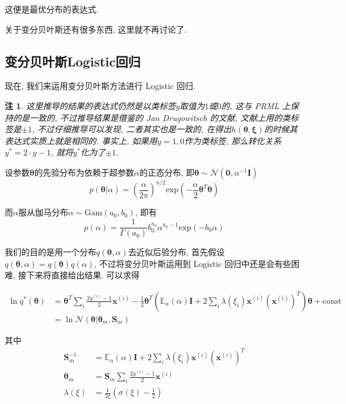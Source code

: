 \documentclass[a4paper,UTF8]{ctexart}
\theoremstyle{plain} \newtheorem{theorem}{定理}[section]
\theoremstyle{plain} \newtheorem{definition}{定义}[section]
\theoremstyle{plain} \newtheorem{lemma}{引理}[section]
\theoremstyle{plain} \newtheorem{proposition}{命题}[section]
\theoremstyle{plain} \newtheorem{example}{例}[section]
\theoremstyle{plain} \newtheorem{remark}{注}[section]
\theoremstyle{plain} \newtheorem{corollary}{推论}[section]
\begin{document}
这便是最优分布的表达式.

关于变分贝叶斯还有很多东西, 这里就不再讨论了.


\subsection{变分贝叶斯Logistic回归}
现在, 我们来运用变分贝叶斯方法进行 Logistic 回归.

\begin{remark}
这里推导的结果的表达式仍然是以类标签$y$取值为$1$或$0$的, 这与 PRML 上保持的是一致的, 不过推导结果是借鉴的 Jan Drugowitsch 的文献, 文献上用的类标签是$\pm 1$, 不过仔细推导可以发现, 二者其实也是一致的, 在得出$h(\bm{\theta}, \bm{\xi})$的时候其表达式实质上就是相同的. 事实上, 如果用$y = 1, 0$作为类标签, 那么转化关系$y^{*} = 2 \cdot y - 1$, 就将$y^{*}$化为了$\pm 1$.

\end{remark}

设参数$\bm{\theta}$的先验分布为依赖于超参数$\alpha$的正态分布, 即$\bm{\theta}\sim \mathcal{N}(\bm{0}, \alpha^{-1} \bm{I})$
\begin{equation*}
p(\bm{\theta} | \alpha) = \left( \frac{\alpha}{2 \pi}\right)^{n/2} \mathrm{exp} \left( -\frac{\alpha}{2} \bm{\theta}^{T} \bm{\theta} \right)
\end{equation*}

而$\alpha$服从伽马分布$\alpha \sim \mathrm{Gam}(a_{0}, b_{0})$, 即有
\begin{equation*}
p(\alpha) = \frac{1}{\Gamma(a_0)} b_{0}^{a_0} \alpha^{a_{0} - 1} \mathrm{exp}(- b_{0} \alpha)
\end{equation*}

我们的目的是用一个分布$q(\bm{\theta}, \alpha)$去近似后验分布, 首先假设$q(\bm{\theta}, \alpha) = q(\bm{\theta}) q(\alpha)$, 不过将变分贝叶斯运用到 Logistic 回归中还是会有些困难, 接下来将直接给出结果. 可以求得

\begin{align*}
\ln q^{*}(\bm{\theta}) & = \bm{\theta}^{T} \sum_{i} \frac{2 y^{(i)} - 1}{2} \bm{x}^{(i)} - \frac{1}{2} \bm{\theta}^{T} \left( \mathbb{E}_{\alpha}(\alpha) \bm{I} + 2 \sum_{i} \lambda(\xi_{i}) \bm{x}^{(i)} (\bm{x}^{(i)})^{T} \right) \bm{\theta} + \mathrm{const} \\ 
& = \ln \mathcal{N}(\bm{\theta} | \bm{\theta}_{m},\bm{S}_{m})
\end{align*}

其中
\begin{align*}
\bm{S}_{m}^{-1} & = \mathbb{E}_{\alpha}(\alpha) \bm{I} + 2 \sum_{i} \lambda(\xi_{i}) \bm{x}^{(i)} (\bm{x}^{(i)})^{T} \\
\bm{\theta}_{m} & = \bm{S}_{m} \sum_{i} \frac{2 y^{(i)} - 1}{2} \bm{x}^{(i)} \\
\lambda(\xi) & = \frac{1}{2 \xi} \left( \sigma(\xi) - \frac{1}{2} \right)
\end{align*}
\end{document}
